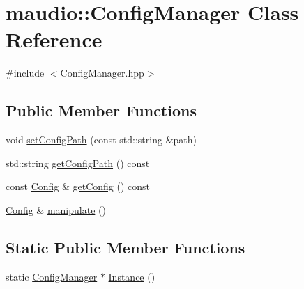 \hypertarget{classmaudio_1_1ConfigManager}{\section{maudio\-:\-:Config\-Manager Class Reference}
\label{classmaudio_1_1ConfigManager}
}


{\ttfamily \#include $<$Config\-Manager.\-hpp$>$}

\subsection*{Public Member Functions}
\begin{DoxyCompactItemize}
\item 
void \hyperlink{classmaudio_1_1ConfigManager_ad05c11aa043d94d1738a1f2800c89120}{set\-Config\-Path} (const std\-::string \&path)
\item 
std\-::string \hyperlink{classmaudio_1_1ConfigManager_ad4a53c6161d1a6053b4cbaa1a941d925}{get\-Config\-Path} () const 
\item 
const \hyperlink{classmaudio_1_1Config}{Config} \& \hyperlink{classmaudio_1_1ConfigManager_abe3f974a561904a6f8bac751e74941b0}{get\-Config} () const 
\item 
\hyperlink{classmaudio_1_1Config}{Config} \& \hyperlink{classmaudio_1_1ConfigManager_a332e953e5007f47943395e164840acbe}{manipulate} ()
\end{DoxyCompactItemize}
\subsection*{Static Public Member Functions}
\begin{DoxyCompactItemize}
\item 
static \hyperlink{classmaudio_1_1ConfigManager}{Config\-Manager} $\ast$ \hyperlink{classmaudio_1_1ConfigManager_a8c673f65be30141b3724cefff0fef5b1}{Instance} ()
\end{DoxyCompactItemize}


